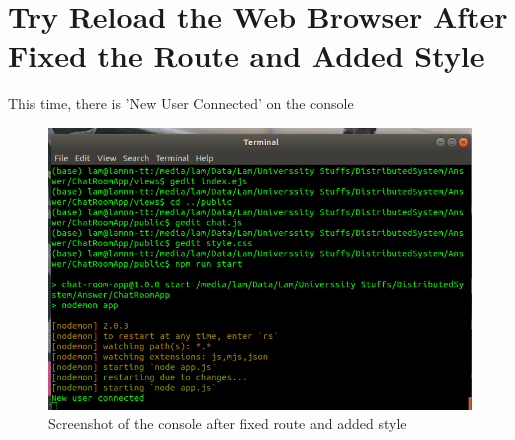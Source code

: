\documentclass[11pt,a4paper]{report}
\begin{document}
	\section{Try Reload the Web Browser After Fixed the Route and Added Style}
	This time, there is 'New User Connected' on the console
	\begin{figure}[h!]
  		\includegraphics[width=\linewidth]{reload-web-after.png}
  		\caption{Screenshot of the console after fixed route and added style}
  		\label{fig:console2}
	\end{figure}
	
\end{document}
